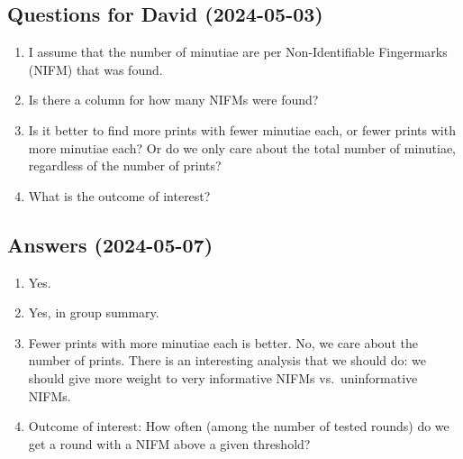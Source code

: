 \documentclass[
]{article}
\begin{document}
\subsection{Questions for David
(2024-05-03)}\label{questions-for-david-2024-05-03}

\begin{enumerate}
\def\labelenumi{\arabic{enumi}.}
\item
  I assume that the number of minutiae are per Non-Identifiable
  Fingermarks (NIFM) that was found.
\item
  Is there a column for how many NIFMs were found?
\item
  Is it better to find more prints with fewer minutiae each, or fewer
  prints with more minutiae each? Or do we only care about the total
  number of minutiae, regardless of the number of prints?
\item
  What is the outcome of interest?
\end{enumerate}

\subsection{Answers (2024-05-07)}\label{answers-2024-05-07}

\begin{enumerate}
\def\labelenumi{\arabic{enumi}.}
\item
  Yes.
\item
  Yes, in group summary.
\item
  Fewer prints with more minutiae each is better. No, we care about the
  number of prints. There is an interesting analysis that we should do:
  we should give more weight to very informative NIFMs vs.~uninformative
  NIFMs.
\item
  Outcome of interest: How often (among the number of tested rounds) do
  we get a round with a NIFM above a given threshold?
\end{enumerate}
\end{document}
